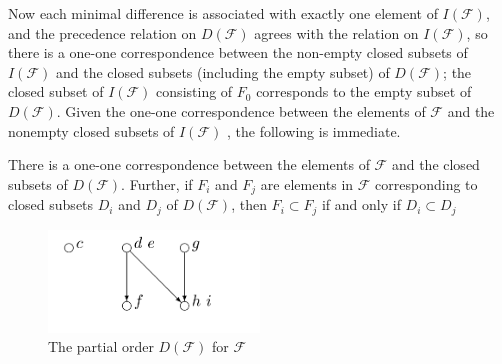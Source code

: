 Now each minimal difference is associated with exactly one element of $I(\mathcal{F})$, and the precedence relation on $D(\mathcal{F})$ agrees with the relation on $I(\mathcal{F})$, so there is a one-one correspondence between the non-empty closed subsets of $I(\mathcal{F})$ and the closed subsets (including the empty subset) of $D(\mathcal{F})$; the closed subset of $I(\mathcal{F})$ consisting of $F_0$ corresponds to the empty subset of $D(\mathcal{F})$. Given the one-one correspondence between the elements of $\mathcal{F}$ and the nonempty closed subsets of $I(\mathcal{F})$ , the following is immediate.

\begin{theo}
There is a one-one correspondence between the elements of $\mathcal{F}$ and the closed subsets of $D(\mathcal{F})$. Further, if $F_i$ and $F_j$ are elements in $\mathcal{F}$ corresponding to closed subsets $D_i$ and $D_j$ of $D(\mathcal{F})$, then $F_i \subset F_j$ if and only if $D_i \subset D_j$
\end{theo}

\begin{figure}[h]
  \centering
  \includegraphics[width=0.5\textwidth]{IMAGES_FIGS/FIG_2_6.png}
  \caption{The partial order $D(\mathcal{F})$ for $\mathcal{F}$}
  \label{FIG_2_8}
\end{figure}